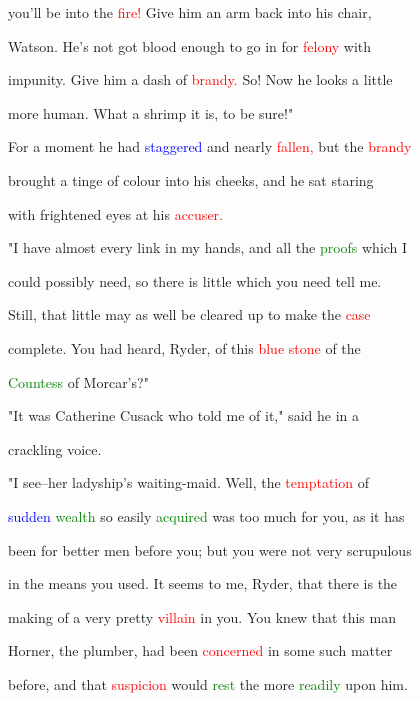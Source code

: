  you'll be into the \textcolor{red}{fire!} Give him an arm back into his chair,

 Watson. He's not got blood enough to go in for \textcolor{red}{felony} with

 impunity. Give him a dash of \textcolor{red}{brandy.} So! Now he looks a little

 more human. What a shrimp it is, to be sure!"



 For a moment he had \textcolor{blue}{staggered} and nearly \textcolor{red}{fallen,} but the \textcolor{red}{brandy}

 brought a tinge of colour into his cheeks, and he sat \textcolor{BurntOrange}{staring}

 with \textcolor{BurntOrange}{frightened} eyes at his \textcolor{red}{accuser.}



 "I have almost every link in my hands, and all the \textcolor{green}{proofs} which I

 could possibly need, so there is little which you need tell me.

 Still, that little may as well be cleared up to make the \textcolor{red}{case}

 complete. You had heard, Ryder, of this \textcolor{red}{blue} \textcolor{red}{stone} of the

 \textcolor{green}{Countess} of Morcar's?"



 "It was Catherine Cusack who told me of it," said he in a

 crackling voice.



 "I see--her ladyship's waiting-maid. Well, the \textcolor{red}{temptation} of

 \textcolor{blue}{sudden} \textcolor{green}{wealth} so easily \textcolor{green}{acquired} was too much for you, as it has

 been for better men before you; but you were not very scrupulous

 in the means you used. It seems to me, Ryder, that there is the

 making of a very \textcolor{BurntOrange}{pretty} \textcolor{red}{villain} in you. You knew that this man

 Horner, the plumber, had been \textcolor{red}{concerned} in some such matter

 before, and that \textcolor{red}{suspicion} would \textcolor{green}{rest} the more \textcolor{green}{readily} upon him.

